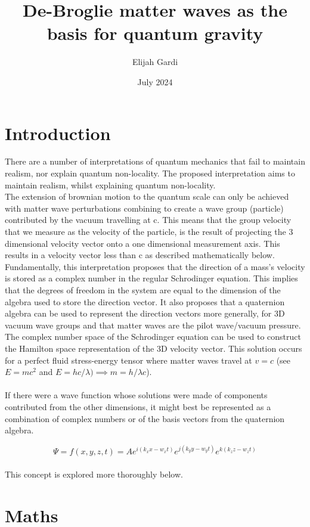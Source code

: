 \documentclass{article}
\title{De-Broglie matter waves as the basis for quantum gravity}
\author{Elijah Gardi}
\date{July 2024}
\begin{document}
\maketitle

\section{Introduction}
There are a number of interpretations of quantum mechanics that fail to maintain realism, nor explain quantum non-locality. The proposed interpretation aims to maintain realism, whilst explaining quantum non-locality.\\
The extension of brownian motion to the quantum scale can only be achieved with matter wave perturbations combining to create a wave group (particle) contributed by the vacuum travelling at c. This means that the group velocity that we measure as the velocity of the particle, is the result of projecting the 3 dimensional velocity vector onto a one dimensional measurement axis. This results in a velocity vector less than c as described mathematically below.\\
Fundamentally, this interpretation proposes that the direction of a mass's velocity is stored as a complex number in the regular Schrodinger equation. This implies that the degrees of freedom in the system are equal to the dimension of the algebra used to store the direction vector. It also proposes that a quaternion algebra can be used to represent the direction vectors more generally, for 3D vacuum wave groups and that matter waves are the pilot wave/vacuum pressure. The complex number space of the Schrodinger equation can be used to construct the Hamilton space representation of the 3D velocity vector. This solution occurs for a perfect fluid stress-energy tensor where matter waves travel at $v=c$ (see $E=mc^2$ and $E=hc/\lambda) \implies m=h/\lambda c$).\\
\\
If there were a wave function whose solutions were made of components contributed from the other dimensions, it might best be represented as a combination of complex numbers or of the basis vectors from the quaternion algebra.

$$\Psi=f(x,y,z,t)=A e^{i(k_x x-w_x t)} e^{j(k_y y-w_y t)} e^{k(k_z z-w_z t)}$$
\\
This concept is explored more thoroughly below. 
\section{Maths}
\end{document}
